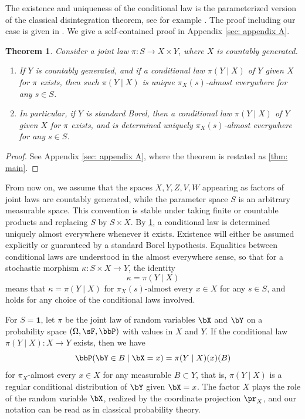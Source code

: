 \documentclass[12pt,reqno]{amsart}%
\theoremstyle{plain}
\newtheorem{theorem}{Theorem}[section]
\theoremstyle{definition}
\def\bsone{\boldsymbol{1}}
\begin{document}
The existence and uniqueness of the conditional law is the parameterized version of the
classical disintegration theorem, see for example \cite[Theorem~1.25]{Kall17}.
The proof including our case is given in \cite{For21}.
We give a self-contained proof in Appendix \ref{sec: appendix A}.

\begin{theorem}\label{thm: CL}
	Consider a joint law $\pi\colon S\rightarrow X\times Y$,
	 where $X$ is countably generated.
	\begin{enumerate}[label=(\roman*)]
		\item If $Y$ is countably generated, and if a conditional law
		 $\pi(Y\mid X)$ of $Y$ given $X$ for $\pi$ exists,
		then such $\pi(Y\mid X)$ is unique $\pi_X(s)$-almost everywhere for any $s\in S$.
		\item In particular, if $Y$ is standard Borel, then
		a conditional law
		 $\pi(Y\mid X)$ of $Y$ given $X$ for $\pi$ exists,
		 and is determined uniquely $\pi_X(s)$-almost everywhere for any $s\in S$.
	\end{enumerate}
\end{theorem}

\begin{proof}
	See Appendix \ref{sec: appendix A}, where the theorem is restated as \cref{thm: main}.
\end{proof}

From now on, we assume that the spaces $X,Y,Z,V,W$ appearing as factors of joint laws are countably generated,
while the parameter space $S$ is an arbitrary measurable space.
This convention is stable under taking finite or countable products and replacing $S$ by $S\times X$.
By \cref{thm: CL}, a conditional law is determined uniquely almost everywhere whenever it exists.
Existence will either be assumed explicitly or guaranteed by a standard Borel hypothesis.
Equalities between conditional laws are understood in the almost everywhere sense, so that
for a stochastic morphism $\kappa\colon S\times X\rightarrow Y$,
the identity
\[
	\kappa=\pi(Y\mid X)
\]
means that $\kappa=\pi(Y\mid X)$ for $\pi_X(s)$-almost every $x\in X$ for any $s\in S$,
and holds for any choice of the conditional laws involved.


\begin{remark}\label{rem: prX}
	For $S=\bsone$, let $\pi$ be the joint law of random variables $\bX$ and $\bY$ on
	a probability space $(\Omega,\sF,\bbP)$ with values in $X$ and $Y$.
	If the conditional law $\pi(Y\mid X)\colon X\rightarrow Y$ exists, then we have
	\[
		\bbP(\bY\in B\mid\bX=x)=\pi(Y\mid X)(x)(B)
	\]
	for $\pi_X$-almost every $x\in X$ for any measurable $B\subset Y$, that is,
	$\pi(Y\mid X)$ is a regular conditional distribution of $\bY$ given $\bX=x$.
	The factor $X$ plays the role of the random variable $\bX$, realized by the
	coordinate projection $\pr_X$, and our notation can be read as in classical probability theory.
\end{remark}
\end{document}

